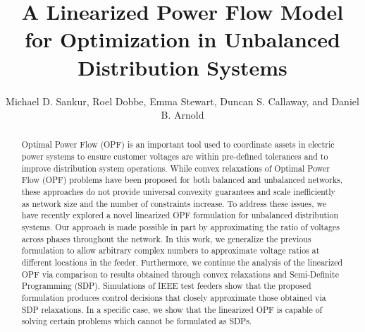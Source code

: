 \documentclass[letterpaper, 10 pt, conference]{ieeeconf}
\title{\LARGE \bf
A Linearized Power Flow Model for Optimization in Unbalanced Distribution Systems}
\author{Michael D. Sankur, Roel Dobbe, Emma Stewart, Duncan S. Callaway, and Daniel B. Arnold%
}
\begin{document}
\maketitle
\thispagestyle{empty}
\pagestyle{empty}



\begin{abstract}
\noindent Optimal Power Flow (OPF) is an important tool used to coordinate assets in electric power systems to ensure customer voltages are within pre-defined tolerances and to improve distribution system operations.  While convex relaxations of Optimal Power Flow (OPF) problems have been proposed for both balanced and unbalanced networks, these approaches do not provide universal convexity guarantees and scale inefficiently as network size and the number of  constraints increase.  To address these issues, we have recently explored a novel linearized OPF formulation for unbalanced distribution systems.  Our approach is made possible in part by approximating the ratio of voltages across phases throughout the network.  In this work, we generalize the previous formulation to allow arbitrary complex numbers to approximate voltage ratios at different locations in the feeder.  Furthermore, we continue the analysis of the linearized OPF via comparison to results obtained through convex relaxations and Semi-Definite Programming (SDP).  Simulations of IEEE test feeders show that the proposed formulation produces control decisions that closely approximate those obtained via SDP relaxations.  In a specific case, we show that the linearized OPF is capable of solving certain problems which cannot be formulated as SDPs.
\end{abstract}


% 
\end{document}

